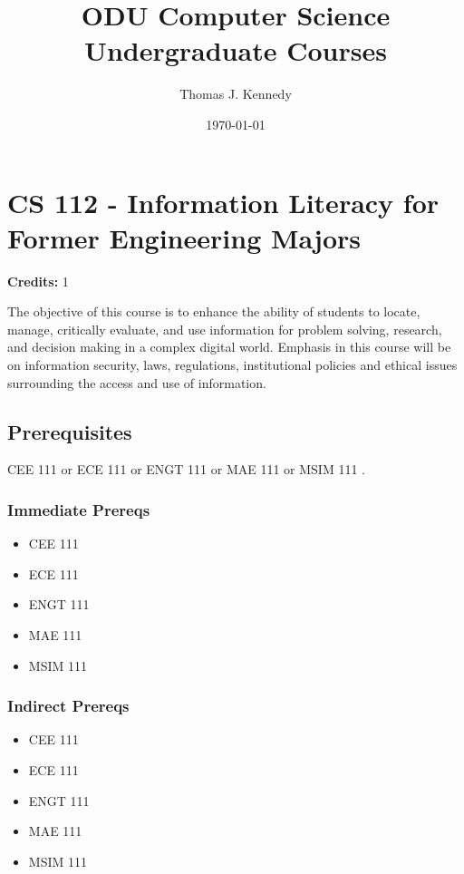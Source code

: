\documentclass[]{article}
\title{ODU Computer Science \\ Undergraduate Courses}
\author{Thomas J. Kennedy}
\date{\today}
\providecommand{\tightlist}{%
  \setlength{\itemsep}{0pt}\setlength{\parskip}{0pt}}
\begin{document}
\begin{titlingpage}
\maketitle
\end{titlingpage}

{
\setcounter{tocdepth}{1}
\tableofcontents
}

\newpage

\section{CS 112 - Information Literacy for Former Engineering
Majors}\label{cs-112---information-literacy-for-former-engineering-majors}

\textbf{Credits:} 1

The objective of this course is to enhance the ability of students to
locate, manage, critically evaluate, and use information for problem
solving, research, and decision making in a complex digital world.
Emphasis in this course will be on information security, laws,
regulations, institutional policies and ethical issues surrounding the
access and use of information.

\subsection{Prerequisites}\label{prerequisites}

CEE 111 or ECE 111 or ENGT 111 or MAE 111 or MSIM 111 .

\subsubsection{Immediate Prereqs}\label{immediate-prereqs}

\begin{itemize}
\tightlist
\item
  CEE 111
\item
  ECE 111
\item
  ENGT 111
\item
  MAE 111
\item
  MSIM 111
\end{itemize}

\subsubsection{Indirect Prereqs}\label{indirect-prereqs}

\begin{itemize}
\tightlist
\item
  CEE 111
\item
  ECE 111
\item
  ENGT 111
\item
  MAE 111
\item
  MSIM 111
\end{itemize}
\end{document}
